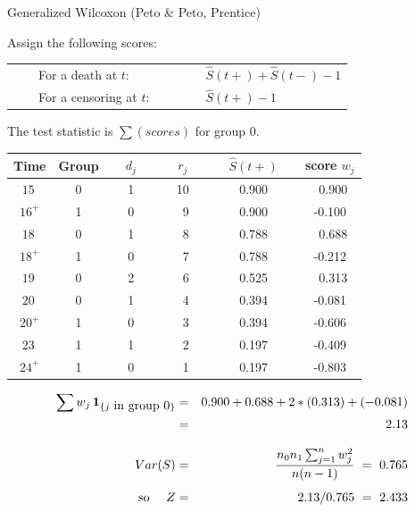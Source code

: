 \documentclass[envcountsect, 10pt, portrait, palatino]{beamer}
\begin{document}
\begin{frame}{Generalized Wilcoxon} (Peto \& Peto, Prentice)

Assign the following scores:\\
\begin{center}
\begin{tabular}{ll}
~~~~For a death at $t$: &             $\hat{S}(t+) + \hat{S}(t-) -1$\\
~~~~For a censoring at $t$:~~~~~~~  & $\hat{S}(t+) - 1$
\end{tabular}
\end{center}

The test statistic is $\sum(scores)$  for group 0.
\scriptsize
\begin{center}
\begin{tabular}{cccccc}
\hline
Time & Group & ~~$d_j$~~ & ~~$r_j$~~ & ~~$\hat{S}(t+)$~~ & score $w_j$\\ \hline
$15~$     &     0   &   1   &   10      & 0.900 & ~0.900 \\
$16^+$    &     1   &   0   &   ~9  & 0.900 & -0.100 \\
$18~$     &     0   &   1   &   ~8  & 0.788 & ~0.688 \\
$18^+$    &     1   &   0   &   ~7  & 0.788 & -0.212 \\
$19~$     &     0   &   2   &   ~6  & 0.525 & ~0.313 \\
$20~$     &     0   &   1   &   ~4  & 0.394 & -0.081 \\
$20^+$    &     1   &   0   &   ~3  & 0.394 & -0.606 \\
$23~$     &     1   &   1   &   ~2  & 0.197 & -0.409 \\
$24^+$    &     1   &   0   &   ~1  & 0.197 & -0.803 \\ \hline
\end{tabular}
\end{center}
\end{frame}

\begin{frame}
\begin{eqnarray*}
\sum w_j \, {\bf 1}_{\{j \mbox{ in group 0}\}}
& = & 0.900 + 0.688 + 2*(0.313) + (-0.081) \\
& = & 2.13\\[2ex]
Var(S) & = & \frac{n_0 n_1 \sum_{j=1}^{n} w_j^2 }{n(n-1)} ~=~ 0.765\\[1ex]
\mbox{so}~~~~ Z & = & 2.13/0.765 ~=~ 2.433
\end{eqnarray*}
\end{frame}
\end{document}
